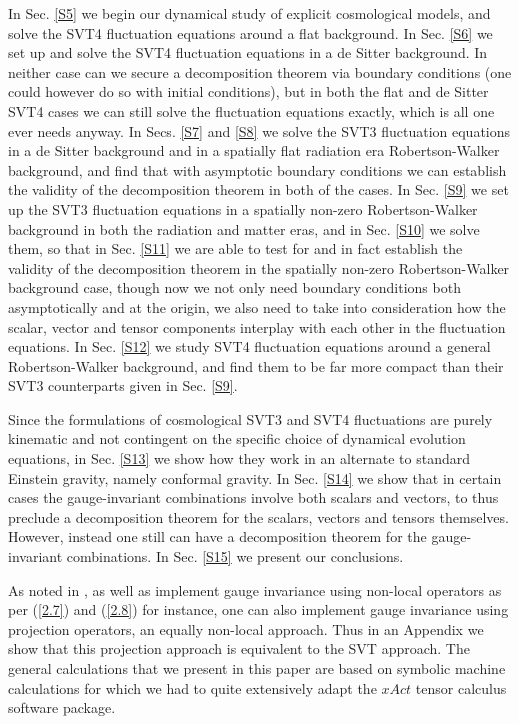\documentclass[aps,onecolumn,10pt]{revtex4}
\numberwithin{equation}{section}
\numberwithin{equation}{section}
\begin{document}
In Sec. \ref{S5} we begin our dynamical study of explicit cosmological models, and solve the SVT4 fluctuation equations around a flat background. In Sec. \ref{S6} we set up and solve the SVT4 fluctuation equations in a de Sitter background. In neither case can we secure a decomposition theorem via boundary conditions (one could however do so with initial conditions), but in both the flat and de Sitter SVT4 cases we can still solve the fluctuation equations exactly, which is all one ever needs anyway.  In Secs. \ref{S7} and \ref{S8} we solve the SVT3 fluctuation equations in a de Sitter background and  in a spatially flat radiation era Robertson-Walker background, and find that with asymptotic boundary conditions we can establish the validity of the decomposition theorem in both of the cases. In Sec. \ref{S9} we set up  the SVT3 fluctuation equations in a spatially non-zero Robertson-Walker background in both the radiation and matter eras, and in Sec. \ref{S10} we solve them, so that in Sec. \ref{S11} we are  able to test for and in fact establish the validity of the decomposition theorem in the spatially non-zero Robertson-Walker background case, though now we not only need boundary conditions both asymptotically and at the origin, we also need to take into consideration how the scalar, vector and tensor components interplay with each other in the fluctuation equations. In Sec. \ref{S12} we study SVT4 fluctuation equations around a general Robertson-Walker background, and find them to be far more compact than their SVT3 counterparts given in Sec. \ref{S9}. 

Since the formulations of cosmological SVT3 and SVT4 fluctuations are purely kinematic and not contingent on the specific choice of dynamical evolution equations, in Sec. \ref{S13} we show how they work in an alternate to standard Einstein gravity, namely conformal gravity.  In Sec. \ref{S14} we show that in certain cases the gauge-invariant combinations involve both scalars and vectors, to thus preclude a decomposition theorem for the scalars, vectors and tensors themselves. However, instead one still can have a decomposition theorem for the gauge-invariant combinations. In Sec. \ref{S15} we present our conclusions. 

As noted in \cite{Amarasinghe2018}, as well as implement gauge invariance using non-local operators as per (\ref{2.7}) and (\ref{2.8}) for instance, one can also implement gauge invariance using projection operators, an equally non-local approach.   Thus in an Appendix  we show that this projection approach is equivalent to the SVT approach. The general calculations that we present in this paper are based on symbolic machine calculations for which we  had to quite extensively adapt the $xAct$ tensor calculus software package.
\end{document}
